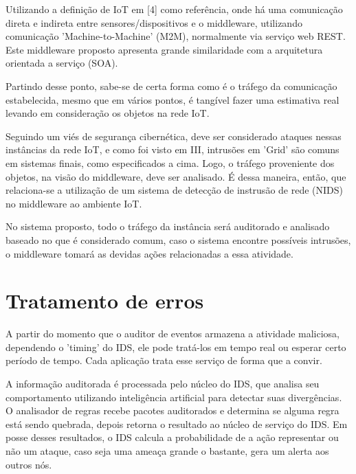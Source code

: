 \documentclass[journal]{IEEEtran}
\begin{document}
Utilizando a definição de IoT em [4] como referência, onde há uma comunicação direta e indireta entre sensores/dispositivos e o middleware, utilizando comunicação 'Machine-to-Machine' (M2M), normalmente via serviço web REST. Este middleware proposto apresenta grande similaridade com a arquitetura orientada a serviço (SOA). \par

Partindo desse ponto, sabe-se de certa forma como é o tráfego da comunicação estabelecida, mesmo que em vários pontos, é tangível fazer uma estimativa real levando em consideração os objetos na rede IoT. \par

Seguindo um viés de segurança cibernética, deve ser considerado ataques nessas instâncias da rede IoT, e como foi visto em III, intrusões em 'Grid' são comuns em sistemas finais, como especificados a cima. Logo, o tráfego proveniente dos objetos, na visão do middleware, deve ser analisado. É dessa maneira, então, que relaciona-se a utilização de um sistema de detecção de instrusão de rede (NIDS) no middleware ao ambiente IoT. \par

No sistema proposto, todo o tráfego da instância será auditorado e analisado baseado no que é considerado comum, caso o sistema encontre possíveis intrusões, o middleware tomará as devidas ações relacionadas a essa atividade.

\section{Tratamento de erros}
A partir do momento que o auditor de eventos armazena a atividade maliciosa, dependendo o 'timing' do IDS, ele pode tratá-los em tempo real ou esperar certo período de tempo. Cada aplicação trata esse serviço de forma que a convir. \par
A informação auditorada é processada pelo núcleo do IDS, que analisa seu comportamento utilizando inteligência artificial para detectar suas divergências. O analisador de regras recebe pacotes auditorados e determina se alguma regra está sendo quebrada, depois retorna o resultado ao núcleo de serviço do IDS. Em posse desses resultados, o IDS calcula a probabilidade de a ação representar ou não um ataque, caso seja uma ameaça grande o bastante, gera um alerta aos outros nós.
\end{document}

